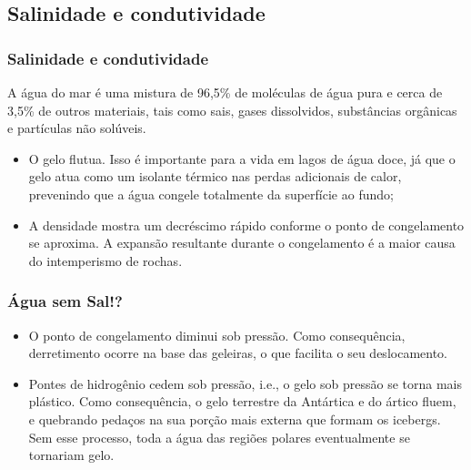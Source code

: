 \subsection{Salinidade e condutividade}
\begin{frame}
\frametitle{Salinidade e condutividade}
    \begin{block}{}
        A água do mar é uma mistura de 96,5\% de moléculas de água pura e cerca
        de 3,5\% de outros materiais, tais como sais, gases dissolvidos,
        substâncias orgânicas e partículas não solúveis.
    \end{block}
    \small{
    \begin{itemize}[<+-| alert@+>]
    \item O gelo flutua. Isso é importante para a vida em lagos de água doce,
    já que o gelo atua como um isolante térmico nas perdas adicionais de calor,
    prevenindo que a água congele totalmente da superfície ao fundo;
    \item A densidade mostra um decréscimo rápido conforme o ponto de
    congelamento se aproxima. A expansão resultante durante o congelamento é a
    maior causa do intemperismo de rochas.
    \end{itemize}
    }
\end{frame}

\begin{frame}
\frametitle{Água sem Sal!?}
    \small{
    \begin{itemize}[<+-| alert@+>]
    \item O ponto de congelamento diminui sob pressão. Como consequência,
    derretimento ocorre na base das geleiras, o que facilita o seu deslocamento.
    \item Pontes de hidrogênio cedem sob pressão, i.e., o gelo sob pressão se
    torna mais plástico. Como consequência, o gelo terrestre da Antártica e do
    ártico fluem, e quebrando pedaços na sua porção mais externa que formam os
    icebergs. Sem esse processo, toda a água das regiões polares eventualmente se
    tornariam gelo.
    \end{itemize}
    }
\end{frame}

